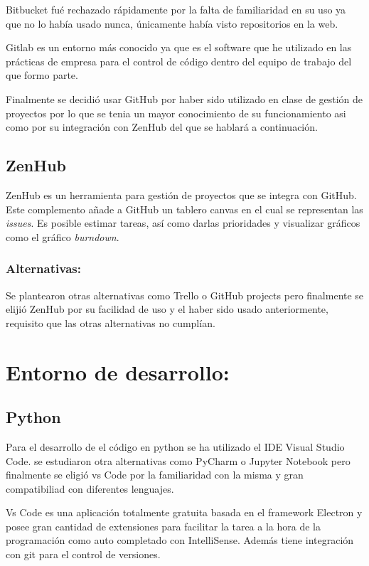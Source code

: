 Bitbucket fué rechazado rápidamente por la falta de familiaridad en su uso ya que no lo había usado nunca, únicamente había visto repositorios en la web.

Gitlab es un entorno más conocido ya que es el software que he utilizado en las prácticas de empresa para el control de código dentro del equipo de trabajo del que formo parte.

Finalmente se decidió usar GitHub por haber sido utilizado en clase de gestión de proyectos por lo que se tenia un mayor conocimiento de su funcionamiento asi como por su integración con ZenHub del que se hablará a continuación.

\subsection{ZenHub}\label{ZenHub}
ZenHub es un herramienta para gestión de proyectos que se integra con GitHub. Este complemento añade a GitHub un tablero canvas en el cual se representan las \emph{issues}. Es posible estimar tareas, así como darlas prioridades y visualizar gráficos como el gráfico \emph{burndown}. \cite{}

\subsubsection{Alternativas:}\label{AlternativasZotero}
Se plantearon otras alternativas como Trello o GitHub projects pero finalmente se elijió  ZenHub por su facilidad de uso y el haber sido usado anteriormente, requisito que las otras alternativas no cumplían.

\section{Entorno de desarrollo:}\label{IDE}
	\subsection{Python}\label{Python}
Para el desarrollo de el código en python se ha utilizado el IDE Visual Studio Code. se estudiaron otra alternativas como PyCharm o Jupyter Notebook pero finalmente se eligió vs Code por la familiaridad con la misma y gran compatibiliad con diferentes lenguajes.

Vs Code es una aplicación totalmente gratuita basada en el framework Electron y posee gran cantidad de extensiones para facilitar la tarea a la hora de la programación como auto completado con IntelliSense. Además tiene integración con git para el control de versiones.

